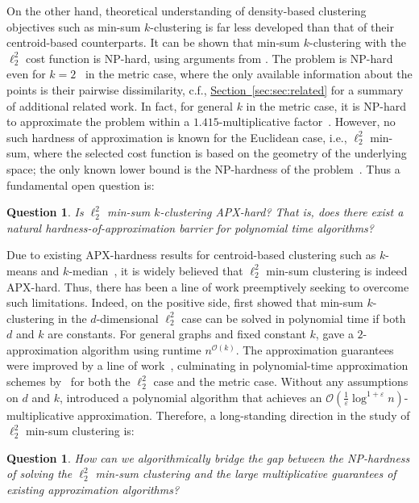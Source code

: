 \documentclass[10pt,a4paper]{amsart}
\newcommand{\namedref}[2]{\hyperref[#2]{#1~\ref*{#2}}}
\newcommand{\secref}[1]{\namedref{Section}{sec:#1}}
\newcommand{\questlab}[1]{\label{quest:#1}}
\newtheorem{question}[theorem]{Question}
\renewcommand{\O}[1]{\ensuremath{\mathcal{O}\left(#1\right)}}
\newcommand{\eps}{\varepsilon}
\begin{document}
On the other hand, theoretical understanding of density-based clustering objectives such as min-sum $k$-clustering is far less developed than that of their centroid-based counterparts. 
It can be shown that min-sum $k$-clustering with the $\ell_2^2$ cost function is NP-hard, using arguments from \cite{AloiseDHP09}. 
The problem is NP-hard even for $k=2$~\cite{VegaK01} in the metric case, where the only available information about the points is their pairwise dissimilarity, c.f., \secref{sec:related} for a summary of additional related work.  
In fact, for general $k$ in the metric case, it is NP-hard to approximate the problem within a $1.415$-multiplicative factor~\cite{GuruswamiI03,Cohen-AddadSL21}. 
However, no such hardness of approximation is known for the Euclidean case, i.e., $\ell_2^2$ min-sum, where the selected cost function is based on the geometry of the underlying space; the only known lower bound is the NP-hardness of the problem~\cite{AloiseDHP09,BanerjeeOR21,AKP24}. 
Thus a fundamental open question is:
\begin{question}
\questlab{quest:apx}
Is $\ell_2^2$ min-sum $k$-clustering APX-hard? 
That is, does there exist a natural hardness-of-approximation barrier for polynomial time algorithms?
\end{question}
Due to existing APX-hardness results for centroid-based clustering such as $k$-means and $k$-median~\cite{LeeSW17,Cohen-AddadS19,Cohen-AddadSL22}, it is widely believed that $\ell_2^2$ min-sum clustering is indeed APX-hard. 
Thus, there has been a line of work preemptively seeking to overcome such limitations. 
Indeed, on the positive side, \cite{InabaKI94} first showed that min-sum $k$-clustering in the $d$-dimensional $\ell_2^2$ case can be solved in polynomial time if both $d$ and $k$ are constants. 
For general graphs and fixed constant $k$, \cite{Guttmann-BeckH98a} gave a $2$-approximation algorithm using runtime $n^{\O{k}}$. 
The approximation guarantees were improved by a line of work~\cite{Indyk99,Matousek00,Schulman00}, culminating in polynomial-time approximation schemes by~\cite{VegaKKR03} for both the $\ell_2^2$ case and the metric case. 
Without any assumptions on $d$ and $k$, \cite{BartalCR01} introduced a polynomial algorithm that achieves an $\O{\frac{1}{\eps}\log^{1+\eps}n}$-multiplicative approximation. 
Therefore, a long-standing direction in the study of $\ell_2^2$ min-sum clustering is:
\begin{question}
\questlab{quest:algs}
How can we algorithmically bridge the gap between the NP-hardness of solving the $\ell_2^2$ min-sum clustering and the large multiplicative guarantees of existing approximation algorithms?
\end{question}
\end{document}
